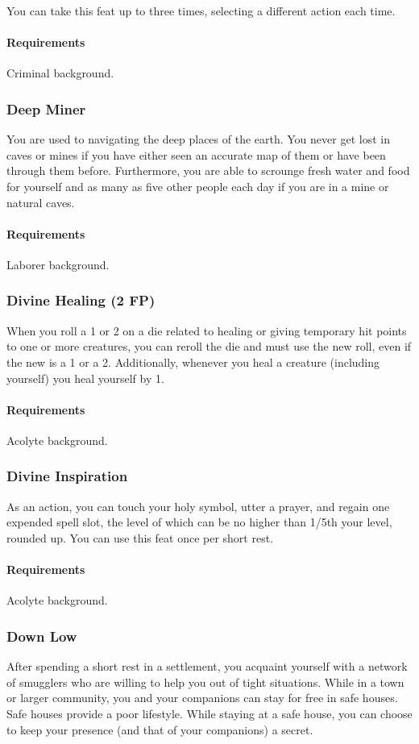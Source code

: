     You can take this feat up to three times, selecting a different action each time.
    \paragraph{Requirements} Criminal background.
\subsubsection{Deep Miner} \label{feat::deepminer}
    You are used to navigating the deep places of the earth.
    You never get lost in caves or mines if you have either seen an accurate map of them or have been through them before.
    Furthermore, you are able to scrounge fresh water and food for yourself and as many as five other people each day if you are in a mine or natural caves.
    \paragraph{Requirements} Laborer background.
\subsubsection{Divine Healing (2 FP)} \label{feat::divinehealing}
    When you roll a 1 or 2 on a die related to healing or giving temporary hit points to one or more creatures, you can reroll the die and must use the new roll, even if the new is a 1 or a 2.
    Additionally, whenever you heal a creature (including yourself) you heal yourself by 1.
    \paragraph{Requirements} Acolyte background.
\subsubsection{Divine Inspiration} \label{feat::divineinspiration}
    As an action, you can touch your holy symbol, utter a prayer, and regain one expended spell slot, the level of which can be no higher than 1/5th your level, rounded up.
    You can use this feat once per short rest.
    \paragraph{Requirements} Acolyte background.
\subsubsection{Down Low} \label{feat::downlow}
    After spending a short rest in a settlement, you acquaint yourself with a network of smugglers who are willing to help you out of tight situations.
    While in a town or larger community, you and your companions can stay for free in safe houses.
    Safe houses provide a poor lifestyle.
    While staying at a safe house, you can choose to keep your presence (and that of your companions) a secret.
